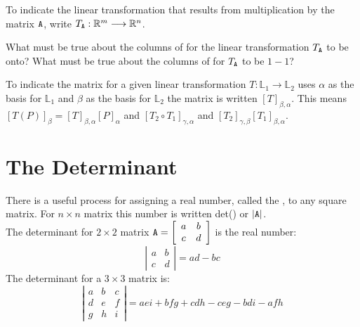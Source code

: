 To indicate the linear transformation that results from multiplication by the matrix $\texttt{A}$,  write $T_{\texttt{A}} :\mathbb{R}^m \longrightarrow \mathbb{R}^n$.

\vspace{.5cm}

\noindent {} What must be true about the columns of  for the linear transformation $T_{\texttt{A}}$ to be onto?  What must be true about the columns of  for $T_{\texttt{A}}$ to be  $1-1$?

\vspace{.5cm}

To indicate the  matrix for a given linear transformation $T:\mathbb{L}_1 \longrightarrow \mathbb{L}_2$ uses $\alpha$  as the basis for  $\mathbb{L}_1$ and $\beta$ as the basis for $\mathbb{L}_2$ the matrix is written $[T]_{\beta, \alpha}$. This means $[T(P)]_{\beta}
=[T]_{\beta, \alpha}[P]_{\alpha}$ and $[T_2 \circ T_1]_{\gamma, \alpha}$ and $[T_2]_{\gamma, \beta}[T_1]_{\beta, \alpha}$.

\vspace{.5cm}

 

\section{The Determinant}    \label{The Determinant}

 \begin{defn} 
	There is a useful process for assigning a real number, called the , to any square matrix. For $n\times n$  matrix  this number is written det() or $|\texttt{A}|$.\\ 
	The determinant for  $2 \times 2$ matrix $\texttt{A}= \left[ \begin{array}{cc}a&b\\c&d \end{array} \right]$ is the real number: \[ \left| \begin{array}{cc}a&b\\c&d \end{array} \right| = ad-bc \] 
	The determinant for a $3 \times 3$ matrix is: \[\left| \begin{array}{ccc}a&b&c\\d&e&f\\g&h&i \end{array} \right| = aei+bfg+cdh-ceg-bdi-afh\]
\end{defn}

\vspace{.5cm}

